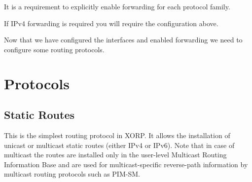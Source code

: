 \documentclass[11pt]{article}
\begin{document}
It is a requirement to explicitly enable forwarding for each
protocol family.

\vspace{0.1in}
\noindent{}
\vspace{0.1in}

If IPv4 forwarding is required you will require the configuration
above.

Now that we have configured the interfaces and enabled forwarding we
need to configure some routing protocols.

\section{Protocols}

\subsection{Static Routes}

This is the simplest routing protocol in XORP. It allows the
installation of unicast or multicast static routes (either IPv4 or
IPv6).  Note that in case of multicast the routes are installed only
in the user-level Multicast Routing Information Base and are used for
multicast-specific reverse-path information by multicast routing
protocols such as PIM-SM.
\end{document}
